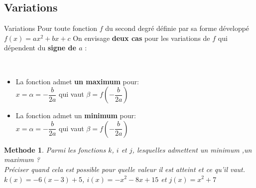 \documentclass[11pt,a4paper]{article}
\theoremstyle{break}
\newtheorem{Meth}{Methode}
\begin{document}
	\subsection{Variations }
	\begin{bclogo}[couleur = yellow!30,arrondi =0.1,logo =\bcbook]{Variations}
		Pour toute fonction $f $ du second degré définie 
		par sa forme développé $f(x)=ax^2+bx+c$ 
		On envisage \textbf{deux cas} pour les variations de $f $ qui dépendent du \textbf{signe de $a$ }:
			\setlength{\columnseprule}{0.4pt} 
				\begin{multicols}{2}
			\\
		\end{multicols}
	\begin{multicols}{2}
		\begin{itemize}
		
			\item La fonction admet \textbf{un maximum} pour:\\ $x=\alpha=-\dfrac b{2a}$ qui vaut $\beta=f(-\dfrac b{2a})$
			
			\item La fonction admet un \textbf{minimum} pour:\\ $x=\alpha=-\dfrac b{2a}$ qui vaut $\beta=f(-\dfrac b{2a})$
		\end{itemize}	\end{multicols}
	\end{bclogo}		
	\begin{Meth}
		Parmi les fonctions $k$, $i$ et $j$, lesquelles admettent un minimum ,un maximum ? \\
		Préciser quand cela est possible pour quelle valeur il est atteint et ce qu’il vaut.\\
		$k(x)=-6(x-3)+5$,	$i(x)=-x^2-8x+15$ et	$j(x)=x^2+7$
	\end{Meth}
	\newpage
\end{document}
